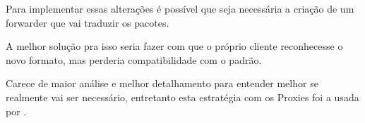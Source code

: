 \documentclass[twoside,english,brazilian]{UNISINOSmonografia}
\begin{document}
		Para implementar essas alterações é possível que seja necessária
		a criação de um forwarder que vai traduzir os pacotes.
		
		A melhor solução pra isso seria fazer com que o próprio cliente
		reconhecesse o novo formato, mas perderia compatibilidade com
		o padrão.
		
		Carece de maior análise e melhor detalhamento para entender 
		melhor se realmente vai ser necessário, entretanto esta estratégia
		com os Proxies foi a usada por \cite{Choi2009}.
	
	
	
	



%


%
\end{document}

